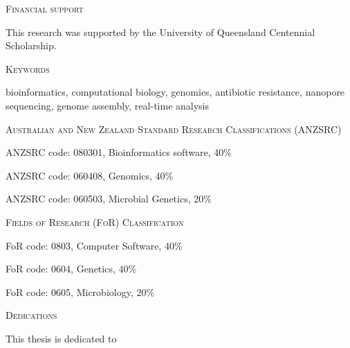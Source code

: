 \afterpage{\null\thispagestyle{empty}\newpage}
\newpage


\thispagestyle{plain}

\begin{center}
\Large \textsc{Financial support}
\end{center}

This research was supported by the University of Queensland Centennial Scholarship.

\vspace{2cm}
\begin{center}
\Large \textsc{Keywords}
\end{center}

bioinformatics, computational biology, genomics, antibiotic resistance, nanopore sequencing, genome assembly, real-time analysis

\vspace{2cm}
\begin{center}
\Large \textsc{Australian and New Zealand Standard Research Classifications (ANZSRC)}
\end{center}

ANZSRC code: 080301, Bioinformatics software, 40\%

ANZSRC code: 060408, Genomics, 40\%

ANZSRC code: 060503, Microbial Genetics, 20\%
\vspace{2cm}

\begin{center}
\Large \textsc{Fields of Research (FoR) Classification}
\end{center}

FoR code: 0803, Computer Software, 40\%

FoR code: 0604, Genetics, 40\%

FoR code: 0605, Microbiology, 20\%
\afterpage{\null\thispagestyle{empty}\newpage}
\newpage

\thispagestyle{plain}

\begin{center}
\Large \textsc{Dedications}
\end{center}
This thesis is dedicated to 

\afterpage{\null\thispagestyle{empty}\newpage}
\newpage